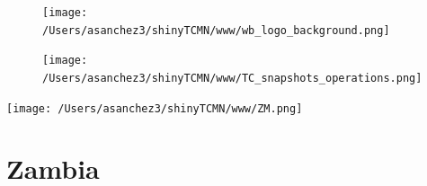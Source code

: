\documentclass{article}\usepackage[]{graphicx}\usepackage[]{color}
\begin{document}
\newpage

\begin{figure}
  \vspace{-3ex} %
  \hspace{-7ex} %
  \texttt{[image: /Users/asanchez3/shinyTCMN/www/wb\_logo\_background.png]}
\end{figure}
\begin{figure}
  \begin{minipage}[t]{0.99\textwidth} %
      \vspace{-30ex}
      \hspace{-2ex}
      \raggedright{\texttt{[image: /Users/asanchez3/shinyTCMN/www/TC\_snapshots\_operations.png]}}
  \end{minipage}
\end{figure}
%
\begin{minipage}[t]{0.99\textwidth} %
  \vspace{-1.5cm}
  \begin{minipage}[c]{0.36\textwidth} 
    \begin{minipage}[c]{0.28\textwidth} %
      \texttt{[image: /Users/asanchez3/shinyTCMN/www/ZM.png]}
    \end{minipage}
    \begin{minipage}[c]{0.70\textwidth} %
      \section*{\color{blue!40!black}Zambia}
    \end{minipage}
  \end{minipage}
  \begin{minipage}[c]{0.63\textwidth}
  \end{minipage}  
\end{minipage} %
\end{document}
